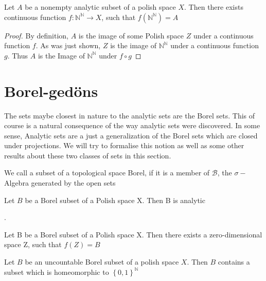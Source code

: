 \documentclass[10pt, a4paper, titlepage]{article}
\numberwithin{equation}{section}
\begin{document}
\begin{theorem}
	Let $A$ be a nonempty analytic subset of a polish space $X$. Then there exists continuous function $f: \mathbb{N}^{\mathbb{N}} \to X$, such that $f\left( \mathbb{N}^{\mathbb{N}} \right) = A$
\end{theorem}
\begin{proof}
	By definition, $A$ is the image of some Polish space $Z$ under a continuous function $f$. As was just shown,  $Z$ is the image of  $\mathbb{N}^\mathbb{N}$ under a continuous function $g$.
	Thus  $A$ is the Image of  $\mathbb{N}^\mathbb{N}$ under $f \circ g$
\end{proof}


\section{Borel-gedöns}
The sets maybe closest in nature to the analytic sets are the Borel sets. 
This of course is a natural consequence of the way analytic sets were discovered. 
In some sense, Analytic sets are a just a generalization of the Borel sets which are closed under projections. 
We will try to formalise this notion as well as some other results about these two classes of sets in this section.

\begin{definition}
	We call a subset of a topological space Borel, if it is a member of $\mathcal{B}$, the $\sigma-$Algebra generated by the open sets
\end{definition}


\begin{theorem}
	Let $B$ be a Borel subset of a Polish space X. Then B is analytic		
\end{theorem}


\begin{definition}
	.	
\end{definition}

\begin{theorem}
	Let B be a Borel subset of a Polish space X. Then there exists a zero-dimensional space Z, such that $f(Z) = B$
\end{theorem}

\begin{theorem}
	Let $B$ be an uncountable Borel subset of a polish space  $X$. Then  $B$ contains a subset which is homeomorphic to  $\left\{ 0,1 \right\}^\mathbb{N}$
	
\end{theorem}
\end{document}
